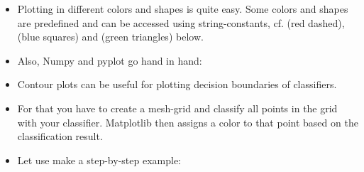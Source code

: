 \begin{frame}
	\begin{itemize}
		\item Plotting in different colors and shapes is quite easy. Some colors and shapes are predefined and can be accessed using string-constants,
			cf.  (red dashed),  (blue squares) and  (green triangles) below.
		\item Also, Numpy and pyplot go hand in hand:
	\end{itemize}
	
	
\end{frame}


\begin{frame}
\end{frame}


\begin{frame}
	\begin{itemize}
		\item Contour plots can be useful for plotting decision boundaries of classifiers.
		\item For that you have to create a mesh-grid and classify all points in the grid with your classifier. Matplotlib then assigns a color
			to that point based on the classification result.
		\item Let use make a step-by-step example: 
	\end{itemize}
\end{frame}


